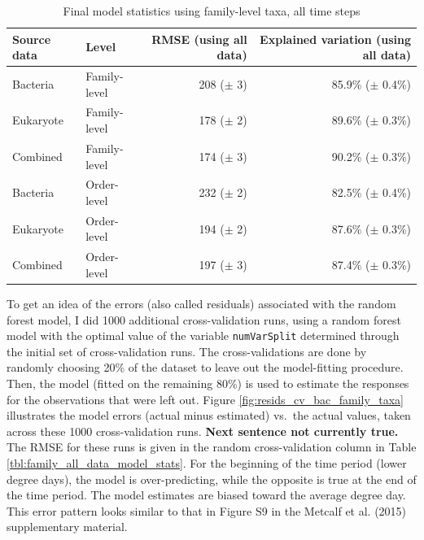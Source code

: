 \documentclass{article}
\begin{document}
\begin{table}
  \centering
\caption{\label{tbl:final_model_stats_all_days}Final model statistics using family-level taxa, all time steps}
\begin{tabular}{llrr}
Source data & Level & RMSE (using all data) & Explained variation (using all data)\\ \hline %
Bacteria  & Family-level & 208 ($\pm$ 3) & 85.9\% ($\pm$ 0.4\%)\\
Eukaryote & Family-level & 178 ($\pm$ 2) & 89.6\% ($\pm$ 0.3\%)\\
Combined  & Family-level & 174 ($\pm$ 3) & 90.2\% ($\pm$ 0.3\%)\\ \hline
Bacteria  & Order-level & 232 ($\pm$ 2) & 82.5\% ($\pm$ 0.4\%)\\
Eukaryote & Order-level & 194 ($\pm$ 2) & 87.6\% ($\pm$ 0.3\%)\\
Combined  & Order-level & 197 ($\pm$ 3) & 87.4\% ($\pm$ 0.3\%)
\end{tabular}
\end{table}

To get an idea of the errors (also called residuals) associated with
the random forest model, I did 1000 additional cross-validation runs,
using a random forest model with the optimal value of the variable
\texttt{numVarSplit} determined through the initial set of
cross-validation runs.  The cross-validations are done by randomly
choosing 20\% of the dataset to leave out the model-fitting procedure.
Then, the model (fitted on the remaining 80\%) is used to estimate the
responses for the observations that were left out.  Figure
\ref{fig:resids_cv_bac_family_taxa} illustrates the model errors
(actual minus estimated) vs.~the actual values, taken across these
1000 cross-validation runs.  \textbf{Next sentence not currently
  true.}  The RMSE for these runs is given in the random
cross-validation column in Table
\ref{tbl:family_all_data_model_stats}.  For the beginning of the time
period (lower degree days), the model is over-predicting, while the
opposite is true at the end of the time period.  The model estimates
are biased toward the average degree day.  This error pattern looks
similar to that in Figure S9 in the Metcalf et al. (2015)
supplementary material.
\end{document}
